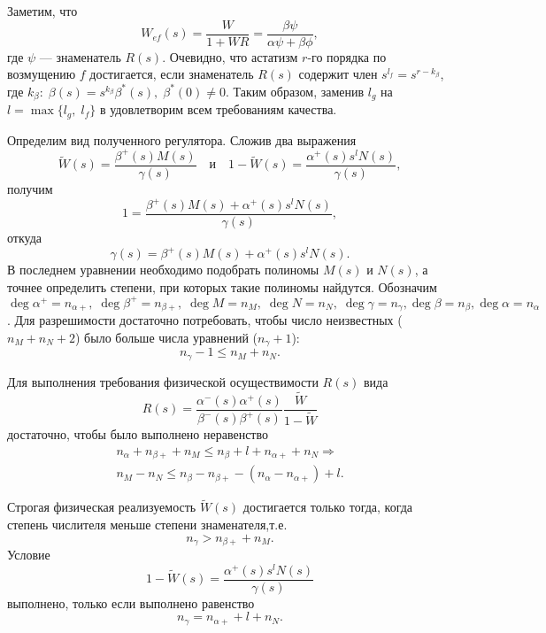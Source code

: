 \documentclass[../../TAU.tex]{subfiles}
\begin{document}
    Заметим, что
    $$
        W_{ef}(s) = \frac{W}{1+WR} = \frac{\beta\psi}{\alpha\psi+\beta\phi},
    $$
    где $\psi$ --- знаменатель $R(s)$. Очевидно, что астатизм $r$-го порядка по возмущению $f$ достигается, если знаменатель $R(s)$ содержит член $s^{l_f}=s^{r-k_\beta}$, где $k_\beta:\; \beta(s) = s^{k_\beta}\beta^*(s),\; \beta^*(0)\neq0$. Таким образом, заменив $l_g$ на $l=\max\{l_g,\;l_f\}$ в  удовлетворим всем требованиям качества.

    Определим вид полученного регулятора. Сложив два выражения
    $$
        \tilde W(s) = \frac{\beta^+(s)M(s)}{\gamma(s)}\quad \text{и}\quad 1-\tilde W(s) = \frac{\alpha^+(s)s^lN(s)}{\gamma(s)},
    $$
    получим
    $$
        1 = \frac{\beta^+(s)M(s)+\alpha^+(s)s^lN(s)}{\gamma(s)},
    $$
    откуда
    \begin{equation}\label{EQ2}
        \gamma(s) = \beta^+(s)M(s)+\alpha^+(s)s^lN(s).
    \end{equation}
    В последнем уравнении необходимо подобрать полиномы $M(s)$ и $N(s)$, а точнее определить степени, при которых такие полиномы найдутся.
    Обозначим $\deg\alpha^+ = n_{\alpha+},\; \deg\beta^+ = n_{\beta+},\; \deg M = n_M,\; \deg N = n_N,\; \deg\gamma = n_\gamma, \deg\beta=n_{\beta},\deg\alpha=n_{\alpha}$. Для разрешимости  достаточно потребовать, чтобы число неизвестных ($n_M+n_N+2$) было больше числа уравнений ($n_\gamma+1$):
    $$
        \boxed{n_\gamma-1 \le n_M+n_N}.
    $$

    Для выполнения требования физической осуществимости $R(s)$ вида
    $$
        R(s) = \frac{\alpha^-(s)\alpha^+(s)}{\beta^-(s)\beta^+(s)}\frac{\tilde W}{1-\tilde W}
    $$
    достаточно, чтобы было выполнено неравенство
    $$
        \begin{aligned}
            n_{\alpha}+n_{\beta+}+n_M \le n_{\beta}+l+n_{\alpha+}+n_N\Longrightarrow\\
            \boxed{n_M-n_N \le n_{\beta}-n_{\beta+}-(n_{\alpha}-n_{\alpha+}) + l}.
        \end{aligned}
    $$

    Строгая физическая реализуемость $\tilde W(s)$ достигается только тогда, когда степень числителя меньше степени знаменателя,т.е.
    $$
        \boxed{n_\gamma > n_{\beta+}+n_M}.
    $$
    Условие
    $$
        1-\tilde W(s) = \frac{\alpha^+(s)s^lN(s)}{\gamma(s)}
    $$
    выполнено, только если выполнено равенство
    $$
        \boxed{n_\gamma = n_{\alpha+}+l+n_N}.
    $$

\end{document}

